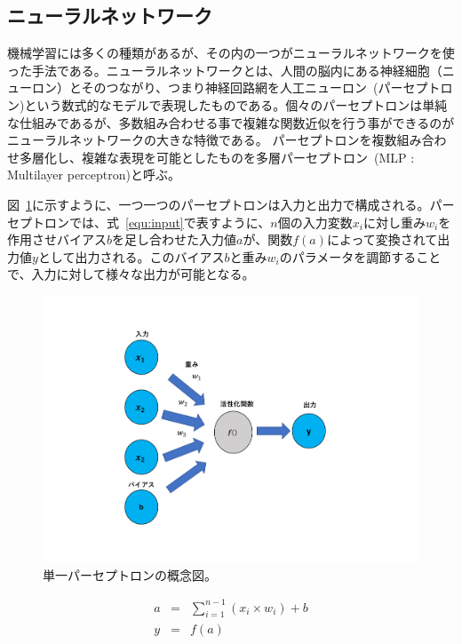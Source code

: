 \subsection{ニューラルネットワーク}
機械学習には多くの種類があるが、その内の一つがニューラルネットワークを使った手法である。ニューラルネットワークとは、人間の脳内にある神経細胞（ニューロン）とそのつながり、つまり神経回路網を人工ニューロン~(パーセプトロン)という数式的なモデルで表現したものである。個々のパーセプトロンは単純な仕組みであるが、多数組み合わせる事で複雑な関数近似を行う事ができるのがニューラルネットワークの大きな特徴である。
パーセプトロンを複数組み合わせ多層化し、複雑な表現を可能としたものを多層パーセプトロン~(MLP : Multilayer perceptron)と呼ぶ。

図~\ref{fig:perce}に示すように、一つ一つのパーセプトロンは入力と出力で構成される。パーセプトロンでは、式~\eqref{equ:input}で表すように、$n$個の入力変数$x_i$に対し重み$w_i$を作用させバイアス$b$を足し合わせた入力値$a$が、関数$f(a)$によって変換されて出力値$y$として出力される。このバイアス$b$と重み$w_i$のパラメータを調節することで、入力に対して様々な出力が可能となる。
\begin{figure}[tb]
  \centering
  \vspace{-3cm}
  \includegraphics[clip, width=15cm]{fig/4/parceptron.pdf}
  \vspace{-2cm}
  \caption{単一パーセプトロンの概念図。}
  \label{fig:perce}
\end{figure}
\begin{eqnarray}
    a &=& \sum^{n-1}_{i=1}(x_i\times w_i) + b \label{equ:input}\\
    y &=& f(a)\label{equ:activation}
\end{eqnarray}
